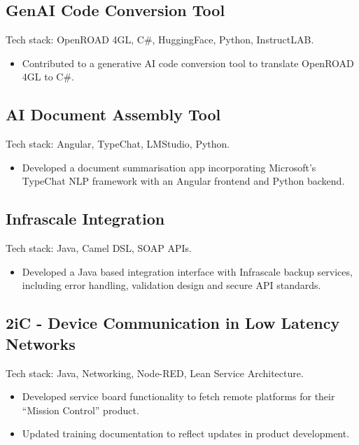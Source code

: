 \documentclass[
  11pt,
  a4paper,
]{article}
\providecommand{\tightlist}{%
  \setlength{\itemsep}{0pt}\setlength{\parskip}{0pt}}
\begin{document}
\subsection{GenAI Code Conversion
Tool}\label{genai-code-conversion-tool}

Tech stack: OpenROAD 4GL, C\#, HuggingFace, Python, InstructLAB.

\begin{itemize}
\tightlist
\item
  Contributed to a generative AI code conversion tool to translate
  OpenROAD 4GL to C\#.
\end{itemize}

\subsection{AI Document Assembly Tool}\label{ai-document-assembly-tool}

Tech stack: Angular, TypeChat, LMStudio, Python.

\begin{itemize}
\tightlist
\item
  Developed a document summarisation app incorporating Microsoft's
  TypeChat NLP framework with an Angular frontend and Python backend.
\end{itemize}

\subsection{Infrascale Integration}\label{infrascale-integration}

Tech stack: Java, Camel DSL, SOAP APIs.

\begin{itemize}
\tightlist
\item
  Developed a Java based integration interface with Infrascale backup
  services, including error handling, validation design and secure API
  standards.
\end{itemize}

\subsection{2iC - Device Communication in Low Latency
Networks}\label{ic---device-communication-in-low-latency-networks}

Tech stack: Java, Networking, Node-RED, Lean Service Architecture.

\begin{itemize}
\tightlist
\item
  Developed service board functionality to fetch remote platforms for
  their ``Mission Control'' product.
\item
  Updated training documentation to reflect updates in product
  development.
\end{itemize}
\end{document}
